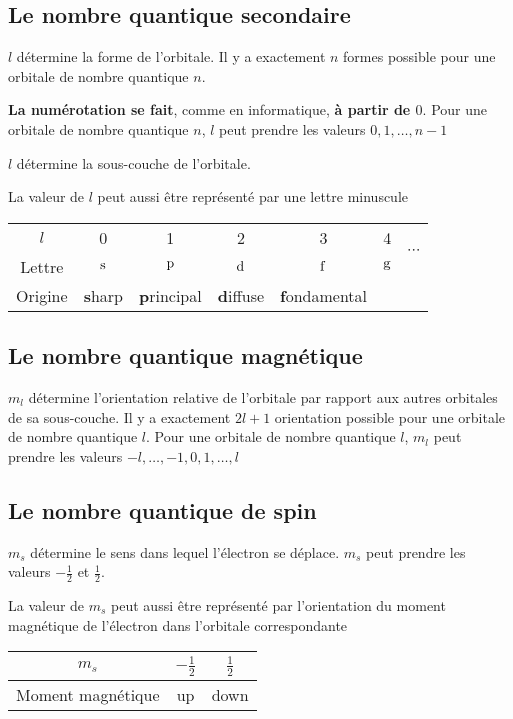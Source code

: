\subsection{Le nombre quantique secondaire}
$l$ détermine la forme de l'orbitale.
Il y a exactement $n$ formes possible pour une orbitale de nombre quantique $n$.

{\bf La numérotation se fait}, comme en informatique, {\bf à partir de $0$}.
Pour une orbitale de nombre quantique $n$, $l$ peut prendre les valeurs $0, 1, \ldots, n-1$

$l$ détermine la sous-couche de l'orbitale.

La valeur de $l$ peut aussi être représenté par une lettre minuscule

\begin{center}
  \begin{tabular}{c|cccccc}
    $l$ & 0 & 1 & 2 & 3 & 4 & \multirow{2}{*}{$\cdots$}\\
    \cline{1-6}
    Lettre & $\mathrm{s}$ & $\mathrm{p}$ & $\mathrm{d}$ & $\mathrm{f}$ & $\mathrm{g}$\\
    Origine & {\bf s}harp & {\bf p}rincipal & {\bf d}iffuse & {\bf f}ondamental
  \end{tabular}
\end{center}

\subsection{Le nombre quantique magnétique}
$m_l$ détermine l'orientation relative de l'orbitale par rapport aux autres orbitales de sa sous-couche.
Il y a exactement $2l + 1$ orientation possible pour une orbitale de nombre quantique $l$.
Pour une orbitale de nombre quantique $l$, $m_l$ peut prendre les valeurs $-l, \ldots, -1,  0, 1, \ldots, l$

\subsection{Le nombre quantique de spin}
$m_s$ détermine le sens dans lequel l'électron se déplace.
$m_s$ peut prendre les valeurs $-\frac{1}{2}$ et $\frac{1}{2}$.

La valeur de $m_s$ peut aussi être représenté par l'orientation du moment magnétique de l'électron dans l'orbitale correspondante
\begin{center}
  \begin{tabular}{c|cc}
    $m_s$ & $-\frac{1}{2}$ & $\frac{1}{2}$\\
    \hline
    Moment magnétique & up & down
  \end{tabular}
\end{center}

